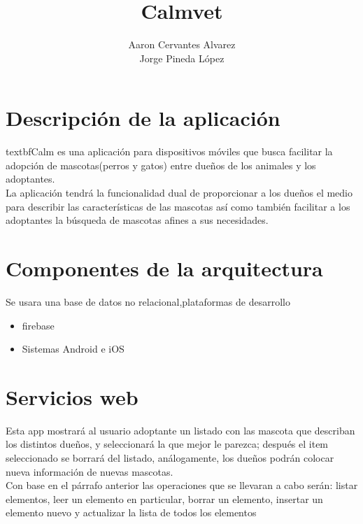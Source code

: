 \documentclass{report}
\title{Calmvet}
\author{Aaron Cervantes Alvarez\\ Jorge Pineda López}
\begin{document}
	\maketitle
	\section*{Descripción de la aplicación}
textbf{Calm} es una aplicación para dispositivos móviles que busca facilitar la adopción de mascotas(perros y gatos) entre dueños de los animales y los adoptantes.\\ La aplicación tendrá la funcionalidad dual de proporcionar a los dueños el medio para describir las características de las mascotas así como también facilitar a los adoptantes la búsqueda de mascotas afines a sus necesidades.

\section*{Componentes de la arquitectura}
Se  usara una base de datos no relacional,plataformas de desarrollo 
	\begin{itemize}
		\item firebase
		\item Sistemas Android e iOS
	\end{itemize}
\section*{Servicios web}
Esta app mostrará al usuario adoptante un listado con las  mascota que describan los distintos dueños, y seleccionará la que mejor le parezca; después el item seleccionado se borrará del listado, análogamente, los dueños podrán colocar nueva información de nuevas mascotas.\\
Con base en el párrafo anterior las operaciones que se llevaran a cabo serán: listar elementos, leer un elemento en particular, borrar un elemento, insertar un elemento nuevo y actualizar la lista de todos los elementos
\end{document}
